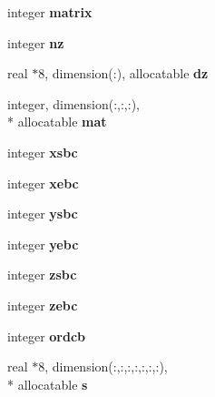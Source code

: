 \begin{DoxyCompactItemize}
\item 
\hypertarget{classinvar_ad66c1deb91ee7d0e72856b25cb0bf6d4}{integer {\bfseries matrix}}\label{classinvar_ad66c1deb91ee7d0e72856b25cb0bf6d4}

\item 
\hypertarget{classinvar_adb3bfc085dfbbc76e236bf7709c98a29}{integer {\bfseries nz}}\label{classinvar_adb3bfc085dfbbc76e236bf7709c98a29}

\item 
\hypertarget{classinvar_a2e800e5321428f5226b62f5e952e9095}{real $\ast$8, dimension(\+:), allocatable {\bfseries dz}}\label{classinvar_a2e800e5321428f5226b62f5e952e9095}

\item 
\hypertarget{classinvar_a2a47bbd7a8e09bd67ee8d9df4dfc5d4c}{integer, dimension(\+:,\+:,\+:), \\*
allocatable {\bfseries mat}}\label{classinvar_a2a47bbd7a8e09bd67ee8d9df4dfc5d4c}

\item 
\hypertarget{classinvar_ac43b19b4e4bcff61f0e4f9524189c8ba}{integer {\bfseries xsbc}}\label{classinvar_ac43b19b4e4bcff61f0e4f9524189c8ba}

\item 
\hypertarget{classinvar_afdac254b51a0c1e15bcdcd5ec78ab097}{integer {\bfseries xebc}}\label{classinvar_afdac254b51a0c1e15bcdcd5ec78ab097}

\item 
\hypertarget{classinvar_a9feb27241762c9dd706e558252f092e9}{integer {\bfseries ysbc}}\label{classinvar_a9feb27241762c9dd706e558252f092e9}

\item 
\hypertarget{classinvar_a9012ac72ddd4547ce6b4b0c28701049e}{integer {\bfseries yebc}}\label{classinvar_a9012ac72ddd4547ce6b4b0c28701049e}

\item 
\hypertarget{classinvar_ab045f0221783a9b1b14a3169a13b652e}{integer {\bfseries zsbc}}\label{classinvar_ab045f0221783a9b1b14a3169a13b652e}

\item 
\hypertarget{classinvar_a6d0cbede1297cdf187502fad15cde4ea}{integer {\bfseries zebc}}\label{classinvar_a6d0cbede1297cdf187502fad15cde4ea}

\item 
\hypertarget{classinvar_ada256e2673f0bae0b39e1bed05a0691a}{integer {\bfseries ordcb}}\label{classinvar_ada256e2673f0bae0b39e1bed05a0691a}

\item 
\hypertarget{classinvar_a319dd4f77663bb45329b5f76da96cd7e}{real $\ast$8, dimension(\+:,\+:,\+:,\+:,\+:,\+:,\+:), \\*
allocatable {\bfseries s}}\label{classinvar_a319dd4f77663bb45329b5f76da96cd7e}


\end{DoxyCompactItemize}
